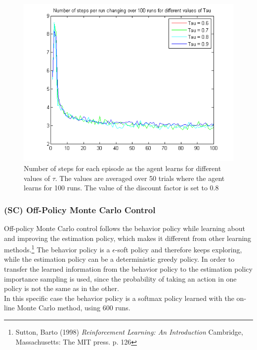 \documentclass{article}
\begin{document}
\begin{figure}
\centering
\caption{Number of steps for each episode as the agent learns for different values of $\tau$. The values are averaged over 50 trials where the agent learns for 100 runs. The value of the discount factor is set to 0.8}
\label{fig:onLineMonteCarloTau}
\includegraphics[scale=0.8]{averagesInOneFig_online_Tau.png}
\end{figure}



\subsubsection{(SC) Off-Policy Monte Carlo Control}\label{sec:exercise4.2}

Off-policy Monte Carlo control follows the behavior policy while learning about and improving the estimation policy, which makes it different from other learning methods.\footnote{Sutton, Barto (1998) \textit{Reinforcement Learning: An Introduction} Cambridge, Massachusetts: The MIT press. p. 126} The behavior policy is a $\epsilon$-soft policy and therefore keeps exploring, while the estimation policy can be a deterministic greedy policy. In order to transfer the learned information from the behavior policy to the estimation policy importance sampling is used, since the probability of taking an action in one policy is not the same as in the other.\\

In this specific case the behavior policy is a softmax policy learned with the on-line Monte Carlo method, using 600 runs. 
\end{document}
